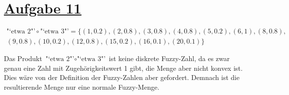 \section*{\underline{Aufgabe 11}}

\begin{multline*}
  \text{"`etwa 2"'} \circ \text{"`etwa 3"'} = \{\left(1, 0.2\right),\left(2, 0.8\right),\left(3, 0.8\right),\left(4, 0.8\right),\left(5, 0.2\right),\left(6, 1\right),\left(8, 0.8\right),\\
  \left(9, 0.8\right),\left(10, 0.2\right),\left(12, 0.8\right),\left(15, 0.2\right),\left(16, 0.1\right),\left(20, 0.1\right)\}
\end{multline*}

Das Produkt $\text{"`etwa 2"'} \circ \text{"`etwa 3"'}$ ist keine diskrete Fuzzy-Zahl, da es zwar genau eine Zahl mit Zugehörigkeitswert 1 gibt, die Menge aber nicht konvex ist. Dies wäre von der Definition der Fuzzy-Zahlen aber gefordert. Demnach ist die resultierende Menge nur eine normale Fuzzy-Menge.